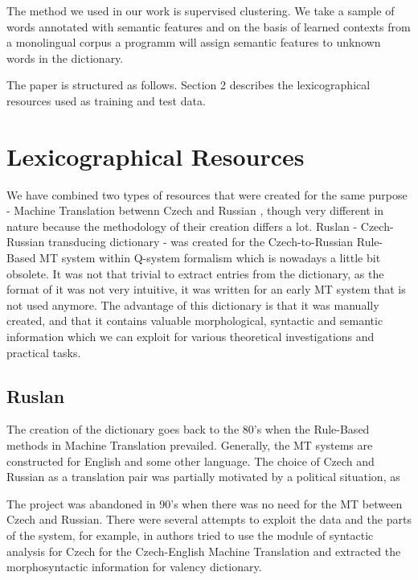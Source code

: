 \documentclass[10pt,a5paper,twoside]{article}
\begin{document}
The method we used in our work is supervised clustering. We take 
a sample of words annotated with semantic features and on the 
basis of learned contexts from a monolingual corpus 
a programm will assign semantic features to unknown words in the dictionary.

The paper is structured as follows. Section 2 describes the lexicographical
resources used as training and test data.  


\section{Lexicographical Resources}
We have combined two types of resources that were created for the same 
purpose - Machine Translation betwenn Czech and Russian
, though very different in nature because
the methodology of their creation differs a lot.  Ruslan - Czech-Russian 
transducing dictionary - was created for the Czech-to-Russian
Rule-Based MT system within Q-system formalism which
is nowadays a little bit obsolete. It was not that trivial to
extract entries from the dictionary, as the format of it was not very intuitive,
it was written for an early MT system that is not used anymore.
The advantage of this dictionary is that it was manually created, and
that it contains valuable morphological, syntactic and semantic information
which we can exploit for various theoretical investigations and practical tasks.

\subsection{Ruslan}
The creation of the dictionary \cite{oliva1989parser} 
goes back to the 80's when the Rule-Based methods
in Machine Translation prevailed. Generally, the MT systems are constructed for
English and some other language. The choice of Czech and Russian as
a translation pair was partially motivated by a political situation, as

 The project was abandoned in 90's when
there was no need for the MT between Czech and Russian. There were
several attempts to exploit the data and the parts of the system, for 
example, in \cite{mt-recycled} authors tried to use the module
of syntactic analysis for Czech for the Czech-English Machine Translation
and \cite{pisa2012} extracted the morphosyntactic information for 
valency dictionary. 
\end{document}
